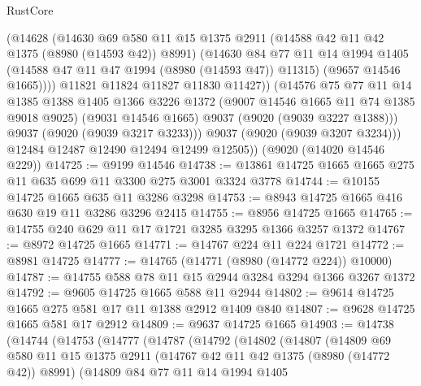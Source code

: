 \begin{lexlean}{RustCore}
\begin{coremodule}
                (@14628
                  (@14630
                    @69
                    @580
                    @11
                    @15
                    @1375
                    @2911
                    (@14588 @42 @11 @42 @1375 (@8980 (@14593 @42)) @8991)
                    (@14630
                      @84
                      @77
                      @11
                      @14
                      @1994
                      @1405
                      (@14588 @47 @11 @47 @1994 (@8980 (@14593 @47)) @11315)
                      (@9657 @14546 @1665))))
                @11821
                @11824
                @11827
                @11830
                @11427))
            (@14576
              @75
              @77
              @11
              @14
              @1385
              @1388
              @1405
              @1366
              @3226
              @1372
              (@9007 @14546 @1665 @11 @74 @1385 @9018 @9025)
              (@9031 @14546 @1665)
              @9037
              (@9020 (@9039 @3227 @1388)))
            @9037
            (@9020 (@9039 @3217 @3233)))
          @9037
          (@9020 (@9039 @3207 @3234)))
        @12484
        @12487
        @12490
        @12494
        @12499
        @12505))
    (@9020 (@14020 @14546 @229))
@14725 := @9199 @14546
@14738 := @13861 @14725 @1665 @1665 @275 @11 @635 @699 @11 @3300 @275 @3001 @3324 @3778
@14744 := @10155 @14725 @1665 @635 @11 @3286 @3298
@14753 := @8943 @14725 @1665 @416 @630 @19 @11 @3286 @3296 @2415
@14755 := @8956 @14725 @1665
@14765 := @14755 @240 @629 @11 @17 @1721 @3285 @3295 @1366 @3257 @1372
@14767 := @8972 @14725 @1665
@14771 := @14767 @224 @11 @224 @1721
@14772 := @8981 @14725
@14777 := @14765 (@14771 (@8980 (@14772 @224)) @10000)
@14787 := @14755 @588 @78 @11 @15 @2944 @3284 @3294 @1366 @3267 @1372
@14792 := @9605 @14725 @1665 @588 @11 @2944
@14802 := @9614 @14725 @1665 @275 @581 @17 @11 @1388 @2912 @1409 @840
@14807 := @9628 @14725 @1665 @581 @17 @2912
@14809 := @9637 @14725 @1665
@14903 := @14738
    (@14744
      (@14753
        (@14777
          (@14787
            (@14792
              (@14802
                (@14807
                  (@14809
                    @69
                    @580
                    @11
                    @15
                    @1375
                    @2911
                    (@14767 @42 @11 @42 @1375 (@8980 (@14772 @42)) @8991)
                    (@14809
                      @84
                      @77
                      @11
                      @14
                      @1994
                      @1405

\end{coremodule}
\end{lexlean}
